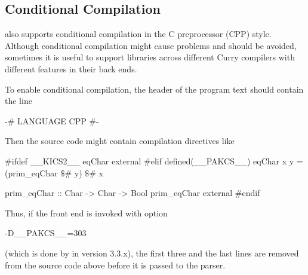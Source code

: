 \subsection{Conditional Compilation}

\CYS also supports conditional compilation in the C preprocessor (CPP)
style. Although conditional compilation might cause problems
and should be avoided, sometimes it is useful to support libraries
across different Curry compilers with different features
in their back ends.

To enable conditional compilation, the header of the program text
should contain the line
%
\begin{curry}
{-# LANGUAGE CPP #-}
\end{curry}
%
Then the source code might contain compilation directives like
%
\begin{curry}
#ifdef __KICS2__
eqChar external
#elif defined(__PAKCS__)
eqChar x y = (prim_eqChar $\$$# y) $\$$# x

prim_eqChar :: Char -> Char -> Bool
prim_eqChar external
#endif
\end{curry}
%
Thus, if the front end is invoked with option
\begin{curry}
-D__PAKCS__=303
\end{curry}
(which is done by \CYS in version 3.3.x),
the first three and the last lines are removed from the
source code above before it is passed to the parser.

